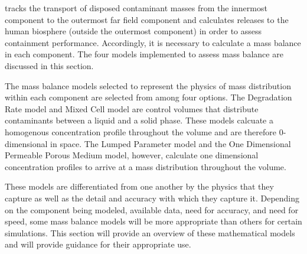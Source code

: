\Cyder tracks the transport of disposed contaminant masses from the innermost 
component to the outermost far field component and calculates releases to the 
human biosphere (outside the outermost component) in order to assess 
containment performance. Accordingly, it is necessary to calculate a mass balance 
in each component. The four models implemented to assess mass balance are 
discussed in this section.

The mass balance models selected to represent the physics of mass distribution
within each component are selected from among four options. The Degradation Rate
model and Mixed Cell model are control volumes that distribute contaminants
between a liquid and a solid phase. These models calcuate a homogenous
concentration profile throughout the volume and are therefore
0-dimensional in space. The Lumped Parameter model and the One Dimensional
Permeable Porous Medium model, however, calculate one dimensional concentration
profiles to arrive at a mass distribution throughout the volume.

These models are differentiated from one another by the physics that they
capture as well as the detail and accuracy with which they capture it.
Depending on the component being modeled, available data, need for
accuracy, and need for speed, some mass balance models will be more appropriate
than others for certain simulations. This section will provide an overview of
these mathematical models and will provide guidance for their appropriate use.
